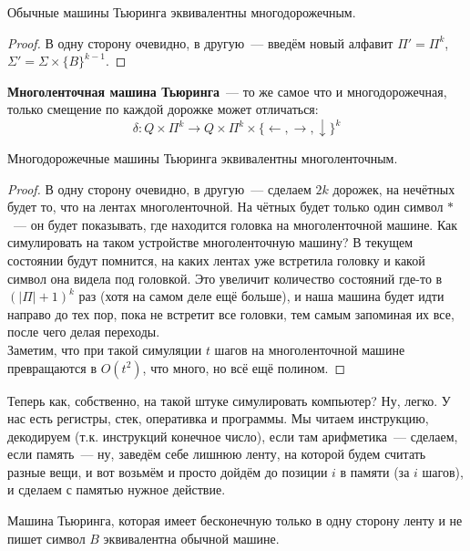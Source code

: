 \documentclass{article}
\begin{document}
    \begin{claim}
        Обычные машины Тьюринга эквивалентны многодорожечным.
    \end{claim}
    \begin{proof}
        В одну сторону очевидно, в другую~--- введём новый алфавит $\Pi'=\Pi^k$, $\Sigma'=\Sigma\times\{B\}^{k-1}$.
    \end{proof}
    \begin{definition}
        \textbf{Многоленточная машина Тьюринга}~--- то же самое что и многодорожечная, только смещение по каждой дорожке может отличаться:
        $$
        \delta\colon Q\times\Pi^k\to Q\times\Pi^k\times\{\leftarrow,\rightarrow,\downarrow\}^k
        $$
    \end{definition}
    \begin{claim}
        Многодорожечные машины Тьюринга эквивалентны многоленточным.
    \end{claim}
    \begin{proof}
        В одну сторону очевидно, в другую~--- сделаем $2k$ дорожек, на нечётных будет то, что на лентах многоленточной. На чётных будет только один символ $*$~--- он будет показывать, где находится головка на многоленточной машине. Как симулировать на таком устройстве многоленточную машину? В текущем состоянии будут помнится, на каких лентах уже встретила головку и какой символ она видела под головкой. Это увеличит количество состояний где-то в $(|\Pi|+1)^k$ раз (хотя на самом деле ещё больше), и наша машина будет идти направо до тех пор, пока не встретит все головки, тем самым запоминая их все, после чего делая переходы.\\
        Заметим, что при такой симуляции $t$ шагов на многоленточной машине превращаются в $O(t^2)$, что много, но всё ещё полином.
    \end{proof}
    \begin{remark}
        Теперь как, собственно, на такой штуке симулировать компьютер? Ну, легко. У нас есть регистры, стек, оперативка и программы. Мы читаем инструкцию, декодируем (т.к. инструкций конечное число), если там арифметика~--- сделаем, если память~--- ну, заведём себе лишнюю ленту, на которой будем считать разные вещи, и вот возьмём и просто дойдём до позиции $i$ в памяти (за $i$ шагов), и сделаем с памятью нужное действие.
    \end{remark}
    \begin{claim}
        Машина Тьюринга, которая имеет бесконечную только в одну сторону ленту и не пишет символ $B$ эквивалентна обычной машине.
    \end{claim}
\end{document}
